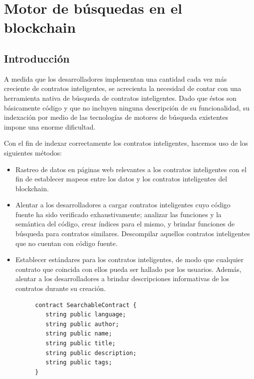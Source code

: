\section{Motor de búsquedas en el blockchain}
\label{sec:search}

\subsection{Introducción}

A medida que los desarrolladores implementan una cantidad cada vez más creciente de contratos inteligentes, se acrecienta la necesidad de contar con una herramienta nativa de búsqueda de contratos inteligentes. Dado que éstos son básicamente código y que no incluyen ninguna descripción de su funcionalidad, su indexación por medio de las tecnologías de motores de búsqueda existentes impone una enorme dificultad.

Con el fin de indexar correctamente los contratos inteligentes, hacemos uso de los siguientes métodos:

\begin{itemize}
	\item Rastreo de datos en páginas web relevantes a los contratos inteligentes con el fin de establecer mapeos entre los datos y los contratos inteligentes del blockchain.

	\item Alentar a los desarrolladores a cargar contratos inteligentes cuyo código fuente ha sido verificado exhaustivamente; analizar las funciones y la semántica del código, crear índices para el mismo, y brindar funciones de búsqueda para contratos similares. Descompilar aquellos contratos inteligentes que no cuentan con código fuente.

	\item Establecer estándares para los contratos inteligentes, de modo que cualquier contrato que coincida con ellos pueda ser hallado por los usuarios. Además, alentar a los desarrolladores a brindar descripciones informativas de los contratos durante su creación. \\

	\begin{figure}[ht]
  	\centering
  	\begin{minipage}{.4\linewidth}
	\begin{lstlisting}[frame=single]
contract SearchableContract {
   string public language;
   string public author;
   string public name;
   string public title;
   string public description;
   string public tags;
}
	\end{lstlisting}
  	\end{minipage}
	\end{figure}

\end{itemize}

